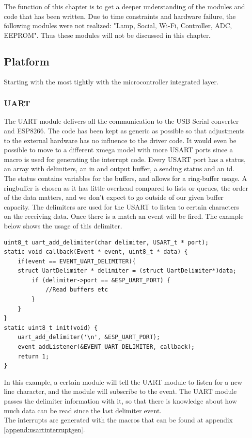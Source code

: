 The function of this chapter is to get a deeper understanding of the modules and code that has been written. Due to time constraints and hardware failure, the following modules were not realized: "Lamp, Social, Wi-Fi, Controller, ADC, EEPROM". Thus these modules will not be discussed in this chapter. 
\subsection{Platform}
Starting with the most tightly with the microcontroller integrated layer.
\subsubsection{UART}
The UART module delivers all the communication to the USB-Serial converter and ESP8266. The code has been kept as generic as possible so that adjustments to the external hardware has no influence to the driver code. It would even be possible to move to a different xmega model with more USART ports since a macro is used for generating the interrupt code. Every USART port has a status, an array with delimiters, an in and output buffer, a sending status and an id. The status contains variables for the buffers, and allows for a ring-buffer usage. A ringbuffer is chosen as it has little overhead compared to lists or queues, the order of the data matters, and we don't expect to go outside of our given buffer capacity. The delimiters are used for the USART to listen to certain characters on the receiving data. Once there is a match an event will be fired. The example below shows the usage of this delimiter.
\begin{verbatim}
uint8_t uart_add_delimiter(char delimiter, USART_t * port);
static void callback(Event * event, uint8_t * data) {
	if(event == EVENT_UART_DELIMITER){
	struct UartDelimiter * delimiter = (struct UartDelimiter*)data;
		if (delimiter->port == &ESP_UART_PORT) {
			//Read buffers etc
		}
	}
}
static uint8_t init(void) {
	uart_add_delimiter('\n', &ESP_UART_PORT);
	event_addListener(&EVENT_UART_DELIMITER, callback);
	return 1;
}
\end{verbatim}
In this example, a certain module will tell the UART module to listen for a new line character, and the module will subscribe to the event. The UART module passes the delimiter information with it, so that there is knowledge about how much data can be read since the last delimiter event.\\ 
The interrupts are generated with the macros that can be found at appendix \ref{append:usartinterruptgen}.
